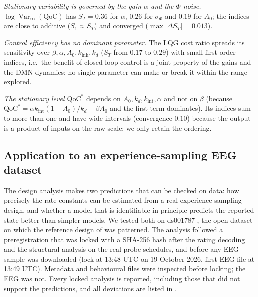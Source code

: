 \documentclass[12pt,a4paper]{article}
\theoremstyle{plain}
\theoremstyle{definition}
\theoremstyle{remark}
\newcommand{\QoC}{\mathrm{QoC}}
\newcommand{\kinh}{k_{\mathrm{inh}}}
\newcommand{\kint}{k_{\mathrm{int}}}
\newcommand{\kd}{k_{d}}
\newcommand{\sPhi}{\sigma_{\Phi}}
\newcommand{\Var}{\operatorname{Var}}
\begin{document}
\emph{Stationary variability is governed by the gain $\alpha$ and the $\Phi$ noise.} $\log\Var_\infty(\QoC)$ has $S_T=0.36$ for $\alpha$, $0.26$ for $\sPhi$ and $0.19$ for $A_0$; the indices are close to additive ($S_1\approx S_T$) and converged ($\max|\Delta S_T|=0.013$).

\emph{Control efficiency has no dominant parameter.} The LQG cost ratio spreads its sensitivity over $\beta,\alpha,A_0,\kinh,\kd$ ($S_T$ from $0.17$ to $0.29$) with small first-order indices, i.e.\ the benefit of closed-loop control is a joint property of the gains and the DMN dynamics; no single parameter can make or break it within the range explored.

\emph{The stationary level $\QoC^*$} depends on $A_0,\kd,\kint,\alpha$ and not on $\beta$ (because $\QoC^*=\alpha\kint(1-A_0)/\kd-\beta A_0$ and the first term dominates). Its indices sum to more than one and have wide intervals (convergence $0.10$) because the output is a product of inputs on the raw scale; we only retain the ordering.

\subsection{Application to an experience-sampling EEG dataset}
\label{sec:res-real}

The design analysis makes two predictions that can be checked on data: how precisely the rate constants can be estimated from a real experience-sampling design, and whether a model that is identifiable in principle predicts the reported state better than simpler models. We tested both on ds001787 \citep{Delorme2024ds,Brandmeyer2018}, the open dataset on which the reference design of  was patterned. The analysis followed a preregistration that was locked with a SHA-256 hash after the rating decoding and the structural analysis on the real probe schedules, and before any EEG sample was downloaded (lock at 13:48 UTC on 19 October 2026, first EEG file at 13:49 UTC). Metadata and behavioural files were inspected before locking; the EEG was not. Every locked analysis is reported, including those that did not support the predictions, and all deviations are listed in .
\end{document}
